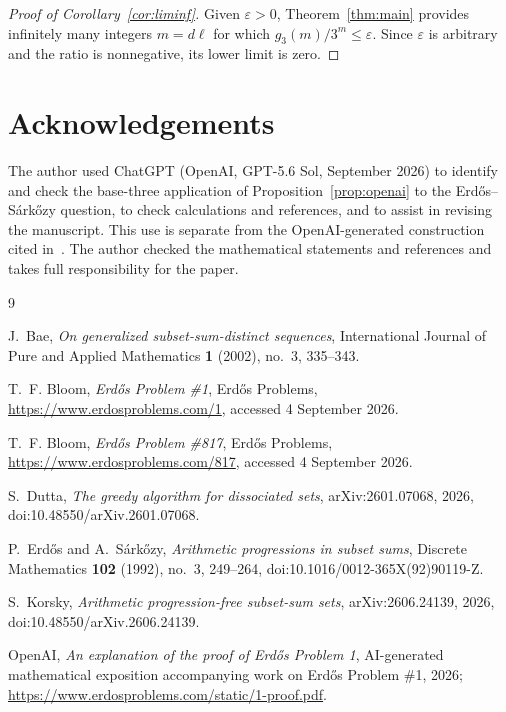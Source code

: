 \documentclass[10pt,a4paper]{amsart}
\theoremstyle{remark}
\newcommand{\ee}{\varepsilon}
\begin{document}
\begin{proof}[Proof of Corollary~\ref{cor:liminf}]
Given $\ee>0$, Theorem~\ref{thm:main} provides infinitely many integers $m=d\ell$ for which
$g_3(m)/3^m\le\ee$. Since $\ee$ is arbitrary and the ratio is nonnegative, its lower limit is zero.
\end{proof}

\section*{Acknowledgements}
The author used ChatGPT (OpenAI, GPT-5.6 Sol, September 2026) to identify and check the base-three application of Proposition~\ref{prop:openai} to the Erd\H{o}s--S\'ark\H{o}zy question, to check calculations and references, and to assist in revising the manuscript. This use is separate from the OpenAI-generated construction cited in~\cite{OpenAI2026}. The author checked the mathematical statements and references and takes full responsibility for the paper.

\begin{thebibliography}{9}

J.~Bae,
\emph{On generalized subset-sum-distinct sequences},
International Journal of Pure and Applied Mathematics \textbf{1} (2002), no.~3, 335--343.

T.~F. Bloom,
\emph{Erd\H{o}s Problem \#1},
Erd\H{o}s Problems, \url{https://www.erdosproblems.com/1}, accessed 4 September 2026.

T.~F. Bloom,
\emph{Erd\H{o}s Problem \#817},
Erd\H{o}s Problems, \url{https://www.erdosproblems.com/817}, accessed 4 September 2026.

S.~Dutta,
\emph{The greedy algorithm for dissociated sets},
arXiv:2601.07068, 2026, doi:10.48550/arXiv.2601.07068.

P.~Erd\H{o}s and A.~S\'ark\H{o}zy,
\emph{Arithmetic progressions in subset sums},
Discrete Mathematics \textbf{102} (1992), no.~3, 249--264,
doi:10.1016/0012-365X(92)90119-Z.

S.~Korsky,
\emph{Arithmetic progression-free subset-sum sets},
arXiv:2606.24139, 2026, doi:10.48550/arXiv.2606.24139.

OpenAI,
\emph{An explanation of the proof of Erd\H{o}s Problem 1},
AI-generated mathematical exposition accompanying work on Erd\H{o}s Problem \#1, 2026; \url{https://www.erdosproblems.com/static/1-proof.pdf}.

\end{thebibliography}
\end{document}
